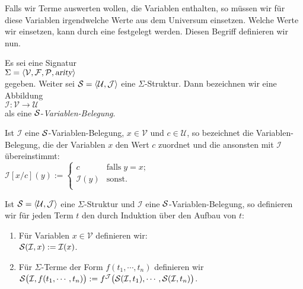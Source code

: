 Falls wir Terme auswerten wollen, die Variablen enthalten, so müssen wir für diese
Variablen irgendwelche Werte aus dem Universum einsetzen.  Welche Werte wir einsetzen, kann
durch eine  festgelegt werden.  Diesen Begriff definieren wir
nun.

\begin{Definition}
    Es sei eine  Signatur \\[0.2cm]
    \hspace*{1.3cm} $\Sigma = \langle \mathcal{V}, \mathcal{F}, \mathcal{P}, \textsl{arity} \rangle$ \\[0.2cm]
    gegeben.  Weiter sei $\mathcal{S} = \langle \mathcal{U}, \mathcal{J} \rangle$ eine $\Sigma$-Struktur.  Dann bezeichnen wir 
     eine Abbildung \\[0.2cm]
    \hspace*{1.3cm} $\mathcal{I}: \mathcal{V} \rightarrow \mathcal{U}$ \\[0.2cm]
    als eine {\color{blue}$\mathcal{S}$-\emph{Variablen-Belegung}}.

    Ist $\mathcal{I}$ eine $\mathcal{S}$-Variablen-Belegung,
    $x \in \mathcal{V}$ und $c \in \mathcal{U}$, so bezeichnet  die Variablen-Belegung, die 
    der Variablen $x$ den Wert $c$ zuordnet und die ansonsten mit $\mathcal{I}$ übereinstimmt: \\[0.2cm]
    \hspace*{1.3cm} 
    $\mathcal{I}[x/c](y) := \left\{
    \begin{array}{ll}
    c               & \mbox{falls}\; y = x;  \\
    \mathcal{I}(y)  & \mbox{sonst}.          \\
    \end{array}
    \right.$ \eox
\end{Definition}
\pagebreak

\begin{Definition}
    Ist $\struct = \pair(\mathcal{U},\mathcal{J})$ eine $\Sigma$-Struktur und $\mathcal{I}$ eine $\mathcal{S}$-Variablen-Belegung,
    so definieren wir für jeden Term $t$ den   durch Induktion über den Aufbau
    von $t$:
    \begin{enumerate}
    \item Für Variablen $x \in \mathcal{V}$ definieren wir: \\[0.2cm]
          \hspace*{1.3cm} $\mathcal{S}(\mathcal{I}, x) := \mathcal{I}(x)$.
    \item Für $\Sigma$-Terme der Form $f(t_1,\cdots,t_n)$ definieren wir \\[0.2cm]
          \hspace*{1.3cm} $\mathcal{S}\bigl(\mathcal{I}, f(t_1,\cdots,t_n)\bigr) := 
                           f^\mathcal{J}\bigl( \mathcal{S}(\mathcal{I}, t_1), \cdots, \mathcal{S}(\mathcal{I}, t_n) \bigr)$.
                           \eox
    \end{enumerate}
\end{Definition}

